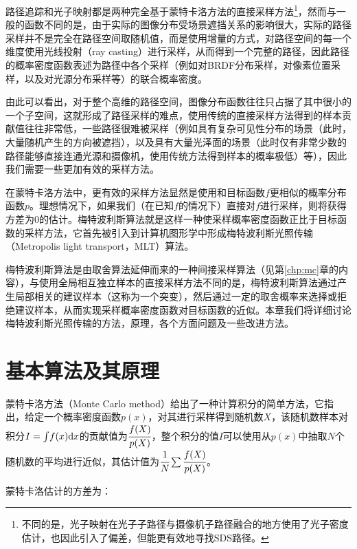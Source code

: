 路径追踪和光子映射都是两种完全基于蒙特卡洛方法的直接采样方法\footnote{不同的是，光子映射在光子子路径与摄像机子路径融合的地方使用了光子密度估计，也因此引入了偏差，但能更有效地寻找SDS路径。}，然而与一般的函数不同的是，由于实际的图像分布受场景遮挡关系的影响很大，实际的路径采样并不是完全在路径空间取随机值，而是使用增量的方式，对路径空间的每一个维度使用光线投射（ray casting）进行采样，从而得到一个完整的路径，因此路径的概率密度函数表述为路径中各个采样（例如对BRDF分布采样，对像素位置采样，以及对光源分布采样等）的联合概率密度。

由此可以看出，对于整个高维的路径空间，图像分布函数往往只占据了其中很小的一个子空间，这就形成了路径采样的难点，使用传统的直接采样方法得到的样本贡献值往往非常低，一些路径很难被采样（例如具有复杂可见性分布的场景（此时，大量随机产生的方向被遮挡），以及具有大量光泽面的场景（此时仅有非常少数的路径能够直接连通光源和摄像机，使用传统方法得到样本的概率极低）等），因此我们需要一些更加有效的采样方法。

在蒙特卡洛方法中，更有效的采样方法显然是使用和目标函数$f$更相似的概率分布函数$p$。理想情况下，如果我们（在已知$f$的情况下）直接对$f$进行采样，则将获得方差为0的估计。梅特波利斯算法就是这样一种使采样概率密度函数正比于目标函数的采样方法，它首先被\cite{a:MetropolisLightTransport}引入到计算机图形学中形成梅特波利斯光照传输（Metropolis light transport，MLT）算法。

梅特波利斯算法是由取舍算法延伸而来的一种间接采样算法（见第\ref{chp:mc}章的内容），与使用全局相互独立样本的直接采样方法不同的是，梅特波利斯算法通过产生局部相关的建议样本（这称为一个突变），然后通过一定的取舍概率来选择或拒绝建议样本，从而实现采样概率密度函数对目标函数的近似。本章我们将详细讨论梅特波利斯光照传输的方法，原理，各个方面问题及一些改进方法。




\section{基本算法及其原理}\label{sec:mlt-mlt}
蒙特卡洛方法（Monte Carlo method）给出了一种计算积分的简单方法，它指出，给定一个概率密度函数$p(x)$，对其进行采样得到随机数$X$，该随机数样本对积分$I={\rm \int} f(x){\rm d}x$的贡献值为$\cfrac{f(X)}{p(X)}$，整个积分的值$I$可以使用从$p(x)$中抽取$N$个随机数的平均进行近似，其估计值为$ \cfrac{1}{N}\sum \cfrac{f(X)}{p(X)}$。

蒙特卡洛估计的方差为：

